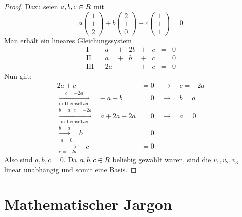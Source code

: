 \begin{phasethree}[Aufschreiben]
\begin{proof}
        Dazu seien $a,b,c\in \relax R$ mit
            \[ a\begin{pmatrix} 1 \\ 1 \\ 2 \end{pmatrix} + b \begin{pmatrix} 2 \\ 1 \\ 0 \end{pmatrix}+c \begin{pmatrix} 1 \\ 1 \\ 1 \end{pmatrix} = 0  \]
        Man erhält ein lineares Gleichungssystem
        \[\begin{array}{rcccccccc}
            \text{I} &&    a &+& 2b &+& c &=& 0 \\
            \text{II} && a &+& b &+& c &=& 0 \\
            \text{III} &&  2a && &+& c &=& 0
        \end{array}\]
        Nun gilt:
        \begingroup
        \allowdisplaybreaks
        \begin{align*}
            2a+c&=0 \quad \to\quad c = -2a \\
            \xrightarrow[\text{in II einsetzen}]{c=-2a}\quad -a+b &=0 \quad\to\quad b=a \\[0.5em]
            \xrightarrow[\text{in I einsetzen}]{b=a,\ c=-2a} \quad a+2a-2a &= 0 \quad\to\quad a= 0 \\
            \xrightarrow{b=a}\quad b &= 0 \\
            \xrightarrow[c=-2a]{a=0,} \quad c &= 0
        \end{align*}
        \endgroup
        Also sind $a,b,c=0$. Da $a,b,c\in \relax R$ beliebig gewählt waren, sind die $v_1,v_2,v_3$ linear unabhängig und somit eine Basis.
    \end{proof}
\end{phasethree}





\chapter{Mathematischer Jargon}


